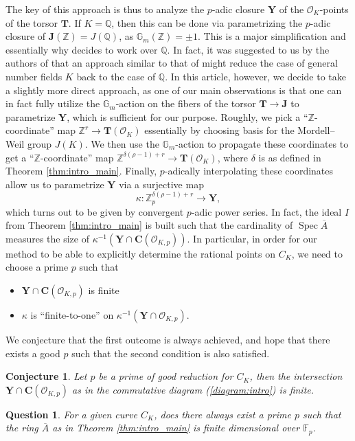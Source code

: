 \documentclass[11pt,oneside]{amsart}
\theoremstyle{plain}
\newtheorem{mainconj}[mainthm]{Conjecture}
\newtheorem{mainqz}[mainthm]{Question}
\theoremstyle{definition}
\DeclareMathOperator{\Gm}{\mathbb{G}_m}
\DeclareMathOperator{\spec}{Spec} \DeclareMathOperator{\sgn}{sign}
\def\TT{\mathbf{T}}
\def\Z{\mathbb{Z}}
\def\F{\mathbb{F}}
\def\Q{\mathbb{Q}}
\def\J{\mathbf{J}}
\def\CC{\mathbf{C}}
\def\ra{\rightarrow}
\def\Gm{{\mathbb{G}_m}}
\def\Y{\mathbf{Y}}
\def\oh{\mathcal{O}}
\begin{document}
The key of this approach is thus to analyze the $p$-adic closure $\Y$ of the $\oh_K$-points of the torsor $\TT$. If $K = \Q$, then this can be done via parametrizing the $p$-adic closure of $\J(\Z) = J (\Q)$, as $\Gm (\Z) = \pm 1$. This is a major simplification and essentially why \cite{EL19} decides to work over $\Q$. In fact, it was suggested to us by the authors of \cite{EL19} that an approach similar to that of \cite{siksek} might reduce the case of general number fields $K$ back to the case of $\Q$. In this article, however, we decide to take a slightly more direct approach, as one of our main observations is that one can in fact fully utilize the $\Gm$-action on the fibers of the torsor $\TT \rightarrow \J$ to parametrize $\Y$, which is sufficient for our purpose. Roughly, we pick a ``$\Z$-coordinate'' map $\Z^{r} \ra \TT(\oh_K)$ essentially by choosing basis for the Mordell--Weil group $J(K)$. We then use the $\Gm$-action to propagate these coordinates to get a  ``$\Z$-coordinate'' map $\Z^{\delta(\rho - 1) + r} \ra \TT(\oh_K)$, where $\delta$ is as defined in Theorem \ref{thm:intro_main}. Finally, $p$-adically interpolating these coordinates allow us to parametrize $\Y$ via a surjective map $$\kappa: \Z_p^{\delta (\rho - 1)+r} \longrightarrow \Y, $$ 
which turns out to be given by convergent $p$-adic power series. In fact, the ideal $I$ from Theorem \ref{thm:intro_main} is built such that the cardinality of  $\spec \overline{A}$ measures the size of $\kappa^{-1} (\Y \cap \CC(\oh_{K, p}))$. In particular, in order for our method to be able to explicitly determine the rational points on $C_K$, we need to choose a prime $p$ such that  
\begin{itemize} 
\item $\Y \cap \CC (\oh_{K, p})$ is finite
\item $\kappa$ is ``finite-to-one'' on $\kappa^{-1} (\Y \cap \oh_{K, p})$. 
\end{itemize}
We conjecture that the first outcome is always achieved, and hope that there exists a good $p$ such that the second condition is also satisfied. 

\begin{mainconj}
Let $p$ be a prime of good reduction for $C_K$, then the intersection $\Y \cap \CC(\oh_{K, p})$ as in the commutative diagram (\ref{diagram:intro}) is finite. 
\end{mainconj} 

\begin{mainqz} \label{question:intro}
For a given curve $C_K$, does there always exist a prime $p$ such that the ring $\overline A$ as in Theorem \ref{thm:intro_main} is finite dimensional over $\F_p$.
\end{mainqz}
\end{document}
